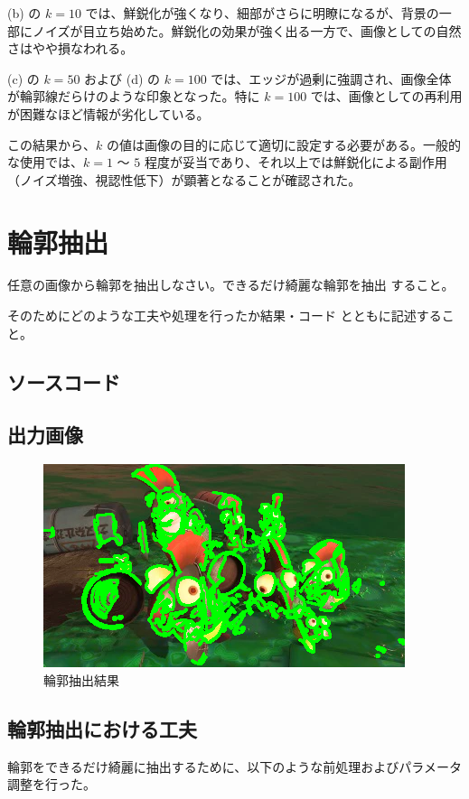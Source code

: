\documentclass[a4paper,11pt,titlepage]{jsarticle}
\begin{document}
(b) の $k=10$ では、鮮鋭化が強くなり、細部がさらに明瞭になるが、背景の一部にノイズが目立ち始めた。鮮鋭化の効果が強く出る一方で、画像としての自然さはやや損なわれる。

(c) の $k=50$ および (d) の $k=100$ では、エッジが過剰に強調され、画像全体が輪郭線だらけのような印象となった。特に $k=100$ では、画像としての再利用が困難なほど情報が劣化している。

この結果から、$k$ の値は画像の目的に応じて適切に設定する必要がある。一般的な使用では、$k=1$ 〜 $5$ 程度が妥当であり、それ以上では鮮鋭化による副作用（ノイズ増強、視認性低下）が顕著となることが確認された。

\section{輪郭抽出}
任意の画像から輪郭を抽出しなさい。できるだけ綺麗な輪郭を抽出
すること。

そのためにどのような工夫や処理を行ったか結果・コード
とともに記述すること。

\subsection{ソースコード}


\subsection{出力画像}

\begin{figure}[htbp]
  \centering
  \includegraphics[width=0.4\linewidth]{syake_contours.png}
  \caption{輪郭抽出結果}
  \label{fig:contour}
\end{figure}


\subsection{輪郭抽出における工夫}

輪郭をできるだけ綺麗に抽出するために、以下のような前処理およびパラメータ調整を行った。
\end{document}
